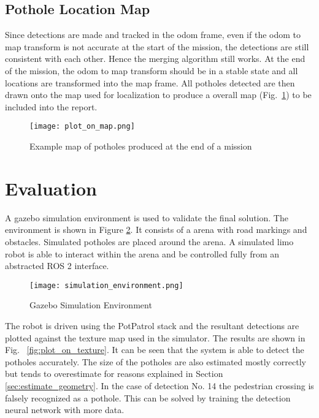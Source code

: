 \documentclass[conference]{IEEEtran}
\begin{document}
\subsection{Pothole Location Map}

Since detections are made and tracked in the odom frame, even if the odom to map transform is not accurate at the start of the mission, the detections are still consistent with each other. Hence the merging algorithm still works. At the end of the mission, the odom to map transform should be in a stable state and all locations are transformed into the map frame. All potholes detected are then drawn onto the map used for localization to produce a overall map (Fig.~\ref{fig:pothole_map}) to be included into the report.

\begin{figure}
    \centering
    \texttt{[image: plot\_on\_map.png]}
    \caption{Example map of potholes produced at the end of a mission}
    \label{fig:pothole_map}
\end{figure}

\section{Evaluation}

A gazebo simulation environment is used to validate the final solution. The environment is shown in Figure \ref{fig:gazebo}. It consists of a arena with road markings and obstacles. Simulated potholes are placed around the arena. A simulated limo robot is able to interact within the arena and be controlled fully from an abstracted ROS 2 interface.

\begin{figure}[h]
    \centering
    \texttt{[image: simulation\_environment.png]}
    \caption{Gazebo Simulation Environment}
    \label{fig:gazebo}
\end{figure}

The robot is driven using the PotPatrol stack and the resultant detections are plotted against the texture map used in the simulator. The results are shown in Fig.~ \ref{fig:plot_on_texture}. It can be seen that the system is able to detect the potholes accurately. The size of the potholes are also estimated mostly correctly but tends to overestimate for reasons explained in Section \ref{sec:estimate_geometry}. In the case of detection No. 14 the pedestrian crossing is falsely recognized as a pothole. This can be solved by training the detection neural network with more data.
\end{document}
